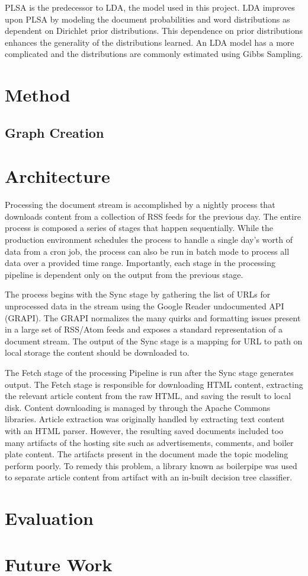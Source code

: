 \documentclass[10pt,twocolumn]{article}
\begin{document}
PLSA is the predecessor to LDA, the model used in this project.  LDA improves upon PLSA by modeling the document probabilities and word distributions as dependent on Dirichlet prior distributions.  This dependence on prior distributions enhances the generality of the distributions learned.  An LDA model has a more complicated and the distributions are commonly estimated using Gibbs Sampling.

\section {Method}
\subsection {Graph Creation}

\section {Architecture}

Processing the document stream is accomplished by a nightly process that downloads content from a collection of RSS feeds for the previous day.  The entire process is composed a series of stages that happen sequentially.  While the production environment schedules the process to handle a single day's worth of data from a cron job, the process can also be run in batch mode to process all data over a provided time range.  Importantly, each stage in the processing pipeline is dependent only on the output from the previous stage.

The process begins with the Sync stage by gathering the list of URLs for unprocessed data in the stream using the Google Reader undocumented API (GRAPI).  The GRAPI normalizes the many quirks and formatting issues present in a large set of RSS/Atom feeds and exposes a standard representation of a document stream.  The output of the Sync stage is a mapping for URL to path on local storage the content should be downloaded to.

The Fetch stage of the processing Pipeline is run after the Sync stage generates output.  The Fetch stage is responsible for downloading HTML content, extracting the relevant article content from the raw HTML, and saving the result to local disk.  Content downloading is managed by through the Apache Commons libraries.  Article extraction was originally handled by extracting text content with an HTML parser.  However, the resulting saved documents included too many artifacts of the hosting site such as advertisements, comments, and boiler plate content.  The artifacts present in the document made the topic modeling perform poorly.  To remedy this problem, a library known as boilerpipe was used to separate article content from artifact with an in-built decision tree classifier.




\section {Evaluation}

\section {Future Work}
\end{document}
